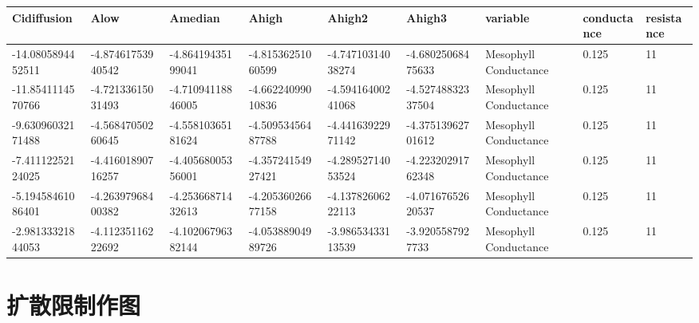 \documentclass[
]{krantz}
\begin{document}
\begin{tabular}{l|l|l|l|l|l|l|l|l}
\hline
Cidiffusion & Alow & Amedian & Ahigh & Ahigh2 & Ahigh3 & variable & conductance & resistance\\
\hline
-14.0805894452511 & -4.87461753940542 & -4.86419435199041 & -4.81536251060599 & -4.74710314038274 & -4.68025068475633 & Mesophyll Conductance & 0.125 & 11\\
\hline
-11.8541114570766 & -4.72133615031493 & -4.71094118846005 & -4.66224099010836 & -4.59416400241068 & -4.52748832337504 & Mesophyll Conductance & 0.125 & 11\\
\hline
-9.63096032171488 & -4.56847050260645 & -4.55810365181624 & -4.50953456487788 & -4.44163922971142 & -4.37513962701612 & Mesophyll Conductance & 0.125 & 11\\
\hline
-7.41112252124025 & -4.41601890716257 & -4.40568005356001 & -4.35724154927421 & -4.28952714053524 & -4.22320291762348 & Mesophyll Conductance & 0.125 & 11\\
\hline
-5.19458461086401 & -4.26397968400382 & -4.25366871432613 & -4.20536026677158 & -4.13782606222113 & -4.07167652620537 & Mesophyll Conductance & 0.125 & 11\\
\hline
-2.98133321844053 & -4.11235116222692 & -4.10206796382144 & -4.05388904989726 & -3.98653433113539 & -3.9205587927733 & Mesophyll Conductance & 0.125 & 11\\
\hline
\end{tabular}

\hypertarget{difu-graph}{%
\section{扩散限制作图}\label{difu-graph}}
\end{document}
